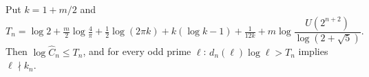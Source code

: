 Put $k=1+m/2$ and
\[ T_n=\log2+\tfrac m2\log\tfrac4\pi+\tfrac12\log(2\pi k)+k(\log k-1)+\tfrac1{12k}+m\log\frac{U(2^{n+2})}{\log(2+\sqrt5)} . \]
Then $\log\widehat C_n\le T_n$, and for every odd prime $\ell$: $d_n(\ell)\log\ell>T_n$ implies $\ell\nmid k_n$.
